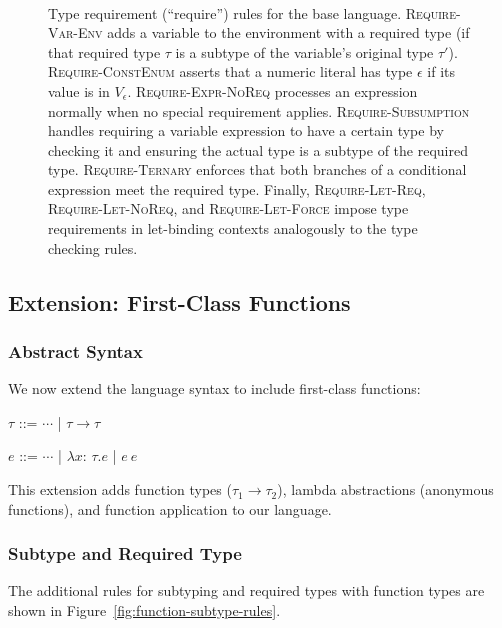 \documentclass[peerreview, 10pt]{IEEEtran}
\newcommand{\funct}[3]{\ensuremath{\lambda #1\mathsf{:}\,#2.#3}}
\newcommand{\apply}[2]{\ensuremath{#1\ #2}}
\newcommand{\arrowt}[2]{\ensuremath{{#1}\rightarrow{#2}}}
\begin{document}
\begin{figure*}[ht]
\begin{framed}
\begin{align*}
{\begin{array}{c}
\end{array}
}
\end{align*}
\end{framed}
\caption{Type requirement (``require'') rules for the base language. \textsc{Require-Var-Env} adds a variable to the environment with a required type (if that required type $\tau$ is a subtype of the variable's original type $\tau'$). \textsc{Require-ConstEnum} asserts that a numeric literal has type $\epsilon$ if its value is in $V_\epsilon$. \textsc{Require-Expr-NoReq} processes an expression normally when no special requirement applies. \textsc{Require-Subsumption} handles requiring a variable expression to have a certain type by checking it and ensuring the actual type is a subtype of the required type. \textsc{Require-Ternary} enforces that both branches of a conditional expression meet the required type. Finally, \textsc{Require-Let-Req}, \textsc{Require-Let-NoReq}, and \textsc{Require-Let-Force} impose type requirements in let-binding contexts analogously to the type checking rules.}
\label{fig:type-requiring-rules}
\end{figure*}

\subsection{Extension: First-Class Functions}
\subsubsection{Abstract Syntax}
We now extend the language syntax to include first-class functions:

\vspace{0.5em}
\begin{bnf}
    $\tau$ ::= $\cdots$ | \arrowt{\tau}{\tau}
\end{bnf}

\begin{bnf}
    $e$ ::= $\cdots$ 
    | \funct{x}{\tau}{e} 
    | \apply{e}{e}
\end{bnf}
\vspace{0.5em}

This extension adds function types ($\tau_1 \to \tau_2$), lambda abstractions (anonymous functions), and function application to our language.

\subsubsection{Subtype and Required Type}
The additional rules for subtyping and required types with function types are shown in Figure~\ref{fig:function-subtype-rules}.
\end{document}
